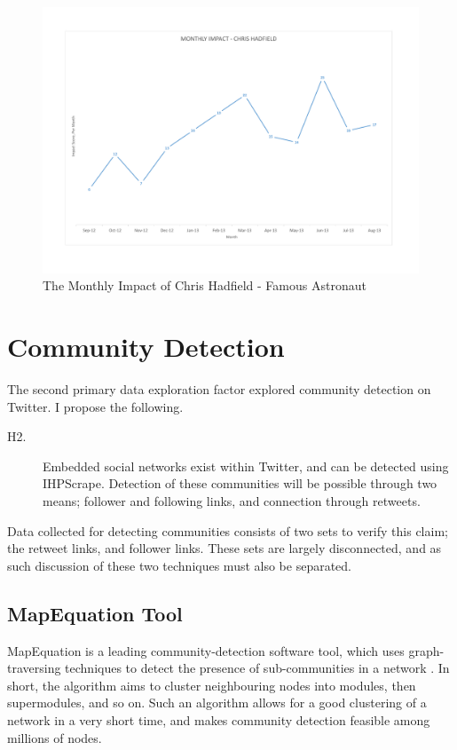 \begin{figure}[h!]
\begin{center}
\centering
\includegraphics[width=500px]{Images/chris_hadfield_monthly_impact.pdf}
\caption{The Monthly Impact of Chris Hadfield - Famous Astronaut}
\end{center}
\end{figure}

\section{Community Detection}

The second primary data exploration factor explored community detection on Twitter. I propose the following. 

\begin{description}
\item[H2.]{Embedded social networks exist within Twitter, and can be detected using IHPScrape. Detection of these communities will be possible through two means; follower and following links, and connection through retweets.}
\end{description}

Data collected for detecting communities consists of two sets to verify this claim; the retweet links, and follower links. These sets are largely disconnected, and as such discussion of these two techniques must also be separated.  

\subsection{MapEquation Tool}

MapEquation is a leading community-detection software tool, which uses graph-traversing techniques to detect the presence of sub-communities in a network \cite{mapequation}. In short, the algorithm aims to cluster neighbouring nodes into modules, then supermodules, and so on. Such an algorithm allows for a good clustering of a network in a very short time, and makes community detection feasible among millions of nodes.

